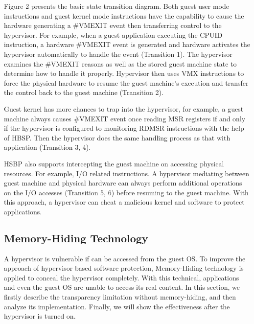 \documentclass[conference]{IEEEtran}
\begin{document}
Figure 2 presents the basic state transition diagram. Both guest
user mode instructions and guest kernel mode instructions have the
capability to cause the hardware generating a \#VMEXIT event then
transferring control to the hypervisor. For example, when a guest
application executing the CPUID instruction, a hardware \#VMEXIT
event is generated and hardware activates the hypervisor
automatically to handle the event (Transition 1). The hypervisor
examines the \#VMEXIT reasons as well as the stored guest machine
state to determine how to handle it properly. Hypervisor then uses
VMX instructions to force the physical hardware to resume the
guest machine's execution and transfer the control back to the
guest machine (Transition 2).

Guest kernel has more chances to trap into the hypervisor, for
example, a guest machine always causes \#VMEXIT event once reading
MSR registers if and only if the hypervisor is configured to
monitoring RDMSR instructions with the help of HBSP. Then the
hypervisor does the same handling process as that with application
(Transition 3, 4).

HSBP also supports intercepting the guest machine on accessing
physical resources. For example, I/O related instructions. A
hypervisor mediating between guest machine and physical hardware
can always perform additional operations on the I/O accesses
(Transition 5, 6) before resuming to the guest machine. With this
approach, a hypervisor can cheat a malicious kernel and software
to protect applications.

\subsection{Memory-Hiding Technology}
A hypervisor is vulnerable if can be accessed from the guest OS.
To improve the approach of hypervisor based software protection,
Memory-Hiding technology is applied to conceal the hypervisor
completely. With this technical, applications and even the guest
OS are unable to access its real content. In this section, we
firstly describe the transparency limitation without
memory-hiding, and then analyze its implementation. Finally, we
will show the effectiveness after the hypervisor is turned on.
\end{document}
